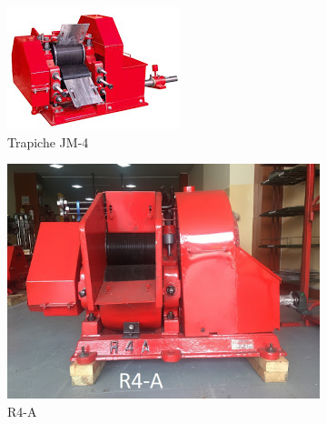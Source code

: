 \documentclass{article}%
\begin{document}
\begin{figure}[h!]%
\begin{subfigure}{0.33\linewidth}%
\includegraphics[width=0.95\linewidth]{Molinos/Trapiche JM-4.jpg}%
\caption{Trapiche JM{-}4}%
\end{subfigure}%
\begin{subfigure}{0.33\linewidth}%
\includegraphics[width=0.95\linewidth]{Molinos/R4-A.jpg}%
\caption{R4{-}A}%
\end{subfigure}%
\begin{subfigure}{0.33\linewidth}%

\end{subfigure}
\end{figure}
\end{document}
